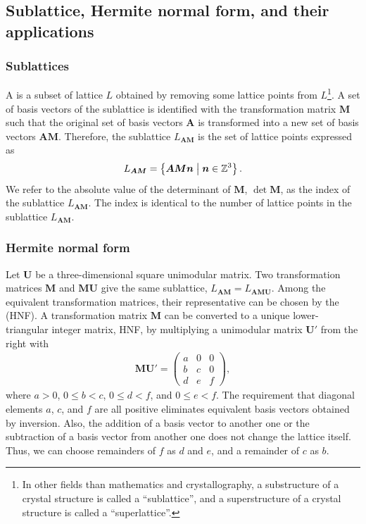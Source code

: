 \subsection{Sublattice, Hermite normal form, and their applications}

\subsubsection{Sublattices}

A  is a subset of lattice $L$ obtained by removing some lattice points from $L$\footnote{
  In other fields than mathematics and crystallography, a substructure of a crystal structure is called a ``sublattice'', and a superstructure of a crystal structure is called a ``superlattice''.
}.
A set of basis vectors of the sublattice is identified with the transformation matrix $\bm{M}$ such that the original set of basis vectors $\bm{A}$ is transformed into a new set of basis vectors $\bm{AM}$.
Therefore, the sublattice $L_{\bm{AM}}$ is the set of lattice points expressed as
\begin{align}
  L_{\bm{AM}} = \left\{  \bm{AMn}  \mathrel{}\middle|\mathrel{}  \bm{n} \in \mathbb{Z}^{3}  \right\}.
\end{align}
We refer to the absolute value of the determinant of $\bm{M}$, $\det \bm{M}$, as the index of the sublattice $L_{\bm{AM}}$.
The index is identical to the number of lattice points in the sublattice $L_{\bm{AM}}$.

\subsubsection{Hermite normal form}

Let $\bm{U}$ be a three-dimensional square unimodular matrix.
Two transformation matrices $\bm{M}$ and $\bm{MU}$ give the same sublattice, $L_{\bm{AM}} = L_{\bm{AMU}}$.
Among the equivalent transformation matrices, their representative can be chosen by the  (HNF).
A transformation matrix $\mathbf{M}$ can be converted to a unique lower-triangular integer matrix, HNF, by multiplying a unimodular matrix $\mathbf{U'}$ from the right with
\begin{align}
    \label{eq:HNF}
    \bm{MU'} =
    \left(
    \begin{array}{ccc}
         a & 0 & 0 \\
         b & c & 0 \\
         d & e & f
    \end{array}
    \right),
\end{align}
where $a > 0$, $0 \leq b < c$, $0 \leq d < f$, and $0 \leq e < f$.
The requirement that diagonal elements $a$, $c$, and $f$ are all positive eliminates equivalent basis vectors obtained by inversion.
Also, the addition of a basis vector to another one or the subtraction of a basis vector from another one does not change the lattice itself.
Thus, we can choose remainders of $f$ as $d$ and $e$, and a remainder of $c$ as $b$.

